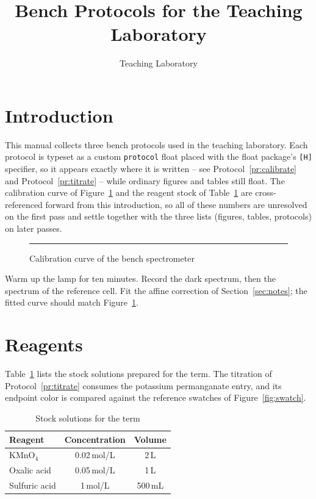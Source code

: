 \documentclass[11pt]{article}
\title{Bench Protocols for the Teaching Laboratory}
\author{Teaching Laboratory}
\date{}
\begin{document}
\maketitle
\tableofcontents
\listoffigures
\listoftables
{}

\section{Introduction}
\label{sec:intro}

This manual collects three bench protocols used in the teaching laboratory.
Each protocol is typeset as a custom \texttt{protocol} float placed with the
\textsf{float} package's \texttt{[H]} specifier, so it appears exactly where
it is written -- see Protocol~\ref{pr:calibrate} and
Protocol~\ref{pr:titrate} -- while ordinary figures and tables still float.
The calibration curve of Figure~\ref{fig:curve} and the reagent stock of
Table~\ref{tab:reagents} are cross-referenced forward from this introduction,
so all of these numbers are unresolved on the first pass and settle together
with the three lists (figures, tables, protocols) on later passes.

\begin{figure}[H]
  \centering
  \rule{0.7\textwidth}{3cm}
  \caption{Calibration curve of the bench spectrometer}
  \label{fig:curve}
\end{figure}

\begin{protocol}[H]
  \caption{Calibrating the spectrometer}
  \label{pr:calibrate}
  Warm up the lamp for ten minutes. Record the dark spectrum, then the
  spectrum of the reference cell. Fit the affine correction of
  Section~\ref{sec:notes}; the fitted curve should match
  Figure~\ref{fig:curve}.
\end{protocol}

\section{Reagents}
\label{sec:reagents}

Table~\ref{tab:reagents} lists the stock solutions prepared for the term.
The titration of Protocol~\ref{pr:titrate} consumes the potassium
permanganate entry, and its endpoint color is compared against the reference
swatches of Figure~\ref{fig:swatch}.

\begin{table}[H]
  \centering
  \begin{tabular}{|l|c|c|}
    \hline
    Reagent & Concentration & Volume \\
    \hline
    KMnO$_4$ & 0.02\,mol/L & 2\,L \\
    Oxalic acid & 0.05\,mol/L & 1\,L \\
    Sulfuric acid & 1\,mol/L & 500\,mL \\
    \hline
  \end{tabular}
  \caption{Stock solutions for the term}
  \label{tab:reagents}
\end{table}
\end{document}
